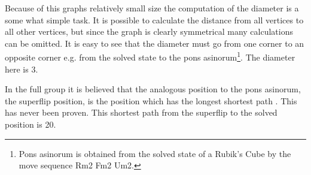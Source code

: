 Because of this graphs relatively small size the computation of the diameter is a some what simple task. It is possible to calculate the distance from all vertices to all other vertices, but since the graph is clearly symmetrical many calculations can be omitted. It is easy to see that the diameter must go from one corner to an opposite corner e.g. from the solved state to the pons asinorum\footnote{Pons asinorum is obtained from the solved state of a Rubik's Cube by the move sequence Rm2 Fm2 Um2.}. The diameter here is 3. 

In the full \rubik{} group it is believed that the analogous position to the pons asinorum, the superflip position, is the position which has the longest shortest path \cite{speedsolving.wiki}. This has never been proven. This shortest path from the superflip to the solved position is 20\cite{rokicki09}.

